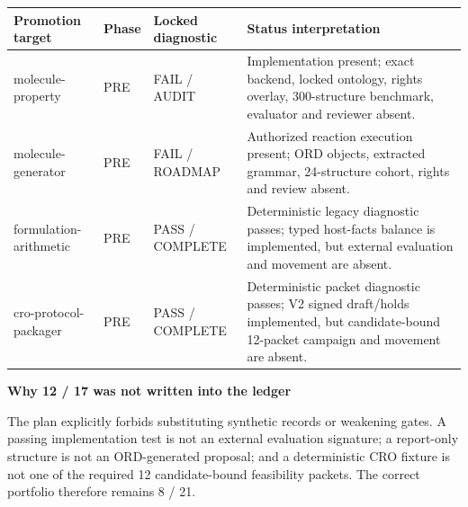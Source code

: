 \documentclass[10pt,a4paper]{article}
\newcommand{\callout}[2]{%
  \begin{tcolorbox}[enhanced,breakable,colback=Panel,colframe=Line,boxrule=.45pt,arc=2mm,left=3mm,right=3mm,top=2.5mm,bottom=2.5mm]
  {\sffamily\bfseries\color{Navy}#1}\par #2
  \end{tcolorbox}}
\begin{document}
\vspace{3mm}
\begin{tabularx}{\linewidth}{@{}p{36mm}C{17mm}C{20mm}Y@{}}
\toprule
\textbf{Promotion target} & \textbf{Phase} & \textbf{Locked diagnostic} & \textbf{Status interpretation} \\
\midrule
molecule-property & PRE & FAIL / AUDIT & Implementation present; exact backend, locked ontology, rights overlay, 300-structure benchmark, evaluator and reviewer absent. \\
molecule-generator & PRE & FAIL / ROADMAP & Authorized reaction execution present; ORD objects, extracted grammar, 24-structure cohort, rights and review absent. \\
formulation-arithmetic & PRE & PASS / COMPLETE & Deterministic legacy diagnostic passes; typed host-facts balance is implemented, but external evaluation and movement are absent. \\
cro-protocol-packager & PRE & PASS / COMPLETE & Deterministic packet diagnostic passes; V2 signed draft/holds implemented, but candidate-bound 12-packet campaign and movement are absent. \\
\bottomrule
\end{tabularx}

\callout{Why 12 / 17 was not written into the ledger}{The plan explicitly forbids substituting synthetic records or weakening gates. A passing implementation test is not an external evaluation signature; a report-only structure is not an ORD-generated proposal; and a deterministic CRO fixture is not one of the required 12 candidate-bound feasibility packets. The correct portfolio therefore remains 8 / 21.}
\newpage
\end{document}
